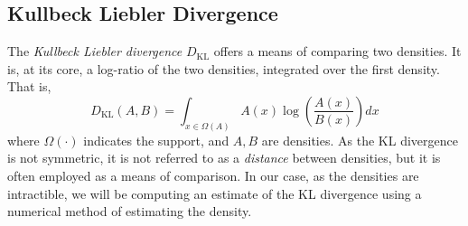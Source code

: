 

\subsection{Kullbeck Liebler Divergence}
The \emph{Kullbeck Liebler divergence} $D_{\text{KL}}$ offers a means of comparing two densities.
  It is, at its core, a log-ratio of the two densities, integrated over the first density.  That is,
  \begin{equation}
    \label{eqn:kld}
    D_{\text{KL}}(A,B) = \int_{x\in \Omega(A)}A(x)\log\left(\frac{A(x)}{B(x)}\right)dx
  \end{equation}
  where $\Omega(\cdot)$ indicates the support, and $A,B$ are densities.  As the KL divergence is not
  symmetric, it is not referred to as a \emph{distance} between densities, but it is often employed
  as a means of comparison.  In our case, as the densities are intractible, we will be computing an
  estimate of the KL divergence using a numerical method of estimating the density.

